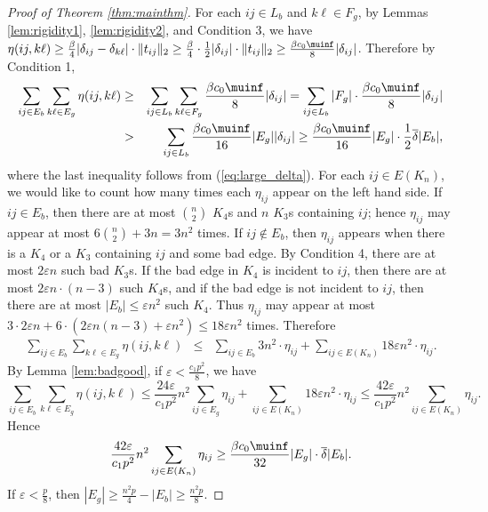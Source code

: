 \begin{proof}[Proof of Theorem \ref{thm:mainthm}]
For each $ij\in L_{b}$ and $k\ell\in F_{g}$, by Lemmas \ref{lem:rigidity1}, \ref{lem:rigidity2},
and Condition 3, we have $\eta(ij,k\ell)\ge \frac{\beta}{4}|\delta_{ij} - \delta_{k\ell}| \cdot\|t_{ij}\|_2 \ge
\frac{\beta}{4} \cdot \frac{1}{2}|\delta_{ij}| \cdot \|t_{ij}\|_2 \ge
\frac{\beta c_{0}\muinf}{8}|\delta_{ij}|$. 
Therefore by Condition 1, 
\begin{eqnarray*}
	\sum_{ij\in E_{b}}\sum_{k\ell\in E_{g}}\eta(ij,k\ell) 
	& \ge & \sum_{ij\in L_{b}}\sum_{k\ell\in F_{g}}\frac{\beta c_{0}\muinf}{8}|\delta_{ij}|=\sum_{ij\in L_{b}}|F_{g}|\cdot\frac{\beta c_{0}\muinf}{8}|\delta_{ij}|\\
	& >  & \sum_{ij\in L_{b}}\frac{\beta c_{0}\muinf}{16}|E_{g}||\delta_{ij}|
	\ge\frac{\beta c_{0}\muinf}{16}|E_{g}|\cdot\frac{1}{2}\overline{\delta}|E_{b}|,
\end{eqnarray*}
where the last inequality follows from (\ref{eq:large_delta}). For
each $ij\in E(K_{n})$, we would like to count how many times each
$\eta_{ij}$ appear on the left hand side. If $ij\in E_{b}$, then
there are at most ${n \choose 2}$ $K_{4}$s and $n$ $K_{3}$s containing
$ij$; hence $\eta_{ij}$ may appear at most $6{n \choose 2}+3n=3n^{2}$
times. If $ij\notin E_{b}$, then $\eta_{ij}$ appears when there is
a $K_{4}$ or a $K_{3}$ containing $ij$ and some bad edge. By Condition
4, there are at most $2\varepsilon n$ such bad $K_{3}$s. If the
bad edge in $K_{4}$ is incident to $ij$, then there are at most
$2\varepsilon n\cdot(n-3)$ such $K_{4}$s, and if the bad edge is
not incident to $ij$, then there are at most $|E_{b}|\le\varepsilon n^{2}$
such $K_{4}$. Thus $\eta_{ij}$ may appear at most $3\cdot2\varepsilon n+6\cdot(2\varepsilon n(n-3)+\varepsilon n^{2})\le18\varepsilon n^{2}$
times. Therefore
\begin{eqnarray*}
	\sum_{ij\in E_{b}}\sum_{k\ell\in E_{g}}\eta(ij,k\ell) 
	& \le & \sum_{ij\in E_{b}}3n^{2}\cdot\eta_{ij}+\sum_{ij\in E(K_{n})}18\varepsilon n^{2}\cdot\eta_{ij}.
\end{eqnarray*}
By Lemma \ref{lem:badgood}, if $\varepsilon < \frac{c_1p^2}{8}$, we have
\[
	\sum_{ij\in E_{b}}\sum_{k\ell\in E_{g}}\eta(ij,k\ell)
	\le\frac{24\varepsilon}{c_{1}p^{2}}n^{2}\sum_{ij\in E_{g}}\eta_{ij}+\sum_{ij\in E(K_{n})}18\varepsilon n^{2}\cdot\eta_{ij}
	\le\frac{42\varepsilon}{c_{1}p^{2}}n^{2}\sum_{ij\in E(K_{n})}\eta_{ij}.
\]
Hence
\[
	\frac{42\varepsilon}{c_{1}p^{2}}n^{2}\sum_{ij\in E(K_{n})}\eta_{ij}\ge\frac{\beta c_{0}\muinf}{32}|E_{g}|\cdot\overline{\delta}|E_{b}|.
\]
If $\varepsilon< \frac{p}{8}$, then $|E_{g}|\ge\frac{n^{2}p}{4}-|E_{b}|\ge\frac{n^{2}p}{8}$. 

\end{proof}
